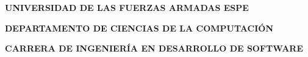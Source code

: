 \newcommand\BackgroundPicCover{%
\put(0,0){%
\parbox[b][\paperheight]{\paperwidth}{%
\vfill
\centering
\textcolor{blue!10}{\rule{\paperwidth}{\paperheight}}%
\vfill
}}}


\begin{titlepage}
    \latofont
    \vspace*{\baselineskip}

    \vspace{2\baselineskip}
    \begin{center}
        {\Large\textbf{UNIVERSIDAD DE LAS FUERZAS ARMADAS ESPE}}
        
        \vspace{0.8cm}
        {\large\textbf{DEPARTAMENTO DE CIENCIAS DE LA COMPUTACIÓN}}
        
        \vspace{0.5cm}
        {\large\textbf{CARRERA DE INGENIERÍA EN DESARROLLO DE SOFTWARE}}
    \end{center}

    \vspace{4\baselineskip}

	\noindent

    \vspace{0.8\baselineskip}

    \noindent

    \vspace{35pt}  

    {\noindent\bfseries\fontsize{14}{19}\selectfont\GetFirstAuthor}

    \ifdefined\GetSecondAuthor
        \vspace{8pt}
        {\noindent\bfseries\fontsize{14}{19}\selectfont\GetSecondAuthor}
	\fi


\end{titlepage}
